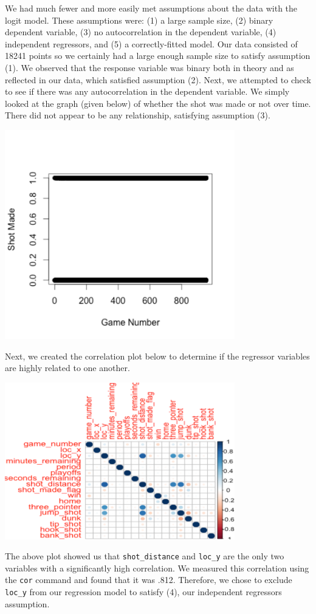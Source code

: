\documentclass[paper=a4, fontsize=11pt]{scrartcl} %
\numberwithin{equation}{section} %
\numberwithin{figure}{section} %
\numberwithin{table}{section} %
\begin{document}
\hspace*{1cm}We had much fewer and more easily met assumptions about the data with the logit model. These assumptions were: (1) a large sample size, (2) binary dependent variable, (3) no autocorrelation in the dependent variable, (4) independent regressors, and (5) a correctly-fitted model. Our data consisted of 18241 points so we certainly had a large enough sample size to satisfy assumption (1). We observed that the response variable was binary both in theory and as reflected in our data, which satisfied assumption (2). Next, we attempted to check to see if there was any autocorrelation in the dependent variable. We simply looked at the graph (given below) of whether the shot was made or not over time. There did not appear to be any relationship, satisfying assumption (3).
\begin{center}
	\includegraphics[width=10cm]{img/autocorrelation}
\end{center}
\hspace*{1cm}Next, we created the correlation plot below to determine if the regressor variables are highly related to one another.
\begin{center}
	\includegraphics[width=10cm]{img/corrplot}
\end{center}
\hspace*{1cm}The above plot showed us that \texttt{shot\_distance} and \texttt{loc\_y} are the only two variables with a significantly high correlation. We measured this correlation using the \texttt{cor} command and found that it was .812. Therefore, we chose to exclude \texttt{loc\_y} from our regression model to satisfy (4), our independent regressors assumption.
\end{document}
